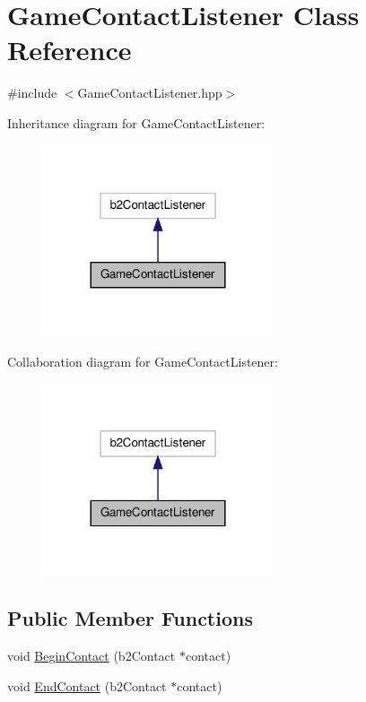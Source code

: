 \hypertarget{class_game_contact_listener}{\section{Game\-Contact\-Listener Class Reference}
\label{class_game_contact_listener}
}


{\ttfamily \#include $<$Game\-Contact\-Listener.\-hpp$>$}



Inheritance diagram for Game\-Contact\-Listener\-:\nopagebreak
\begin{figure}[H]
\begin{center}
\leavevmode
\includegraphics[width=192pt]{class_game_contact_listener__inherit__graph}
\end{center}
\end{figure}


Collaboration diagram for Game\-Contact\-Listener\-:\nopagebreak
\begin{figure}[H]
\begin{center}
\leavevmode
\includegraphics[width=192pt]{class_game_contact_listener__coll__graph}
\end{center}
\end{figure}
\subsection*{Public Member Functions}
\begin{DoxyCompactItemize}
\item 
void \hyperlink{class_game_contact_listener_a3a66eddc0010a96f83a0cb61d3835cc7}{Begin\-Contact} (b2\-Contact $\ast$contact)
\item 
void \hyperlink{class_game_contact_listener_a2d754e57a4f6c88541853a506ec3b10d}{End\-Contact} (b2\-Contact $\ast$contact)
\end{DoxyCompactItemize}


